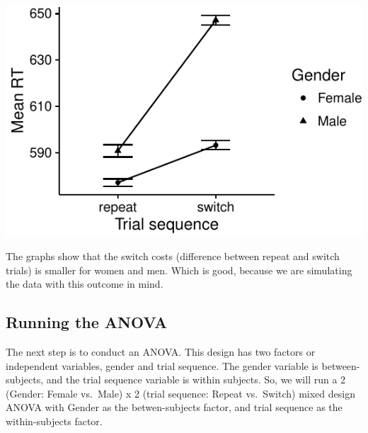 \begin{Shaded}
\begin{Highlighting}[]
\NormalTok{(}
\StringTok{  }\NormalTok{()+}
\StringTok{  }\NormalTok{()+}
\StringTok{  }\NormalTok{)+}
\StringTok{  }\NormalTok{(}\NormalTok{)+}
\StringTok{  }\NormalTok{(}\NormalTok{)+}
\StringTok{  }\NormalTok{(}\NormalTok{)}
\end{Highlighting}
\end{Shaded}

\includegraphics{Lab5_files/figure-latex/unnamed-chunk-3-1}

The graphs show that the switch costs (difference between repeat and
switch trials) is smaller for women and men. Which is good, because we
are simulating the data with this outcome in mind.

\subsection{Running the ANOVA}\label{running-the-anova}

The next step is to conduct an ANOVA. This design has two factors or
independent variables, gender and trial sequence. The gender variable is
between-subjects, and the trial sequence variable is within subjects.
So, we will run a 2 (Gender: Female vs.~Male) x 2 (trial sequence:
Repeat vs.~Switch) mixed design ANOVA with Gender as the betwen-subjects
factor, and trial sequence as the within-subjects factor.

